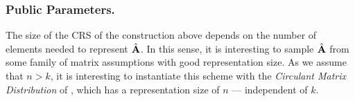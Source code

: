 \subsubsection{Public Parameters.} The size of the CRS of the construction above depends on the number of elements needed to represent ${\hat{\mathbf{{A}}}}$. In this sense, it is interesting to sample ${\hat{\mathbf{{A}}}}$ from some family of matrix assumptions with good representation size. As we assume that $n>k$, it is interesting to instantiate this scheme with the \textit{Circulant Matrix Distribution} of \cite{EPRINT:MorRafVil15}, which has a representation size of $n$ --- independent of $k$. 



 


